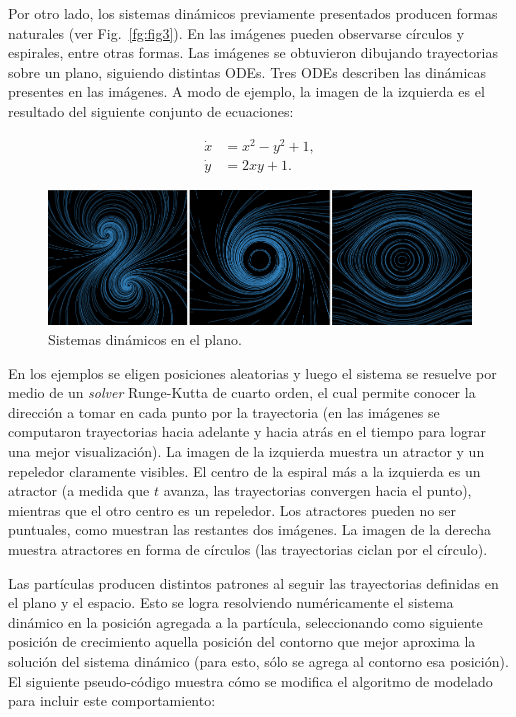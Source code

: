 \documentclass[spanish,a4paper,openright,11pt]{book}
\begin{document}
Por otro lado, los sistemas din\'amicos previamente presentados producen formas naturales (ver Fig.~\ref{fg:fig3}). En las im\'agenes pueden observarse c\'irculos y espirales, entre otras formas. Las im\'agenes se obtuvieron dibujando trayectorias sobre un plano, siguiendo distintas ODEs. Tres ODEs describen las din\'amicas presentes en las im\'agenes. A modo de ejemplo, la imagen de la izquierda es el resultado del siguiente conjunto de ecuaciones:

\begin{equation} \label{eq:simple}  
  \begin{aligned}
    \dot{x} &= x^{2}-y^{2}+1,\\
    \dot{y} &= 2xy+1.
  \end{aligned}
\end{equation}


\begin{figure}[htb!]
  \centerline{\includegraphics[scale=0.28]{sistdin2}}
  \caption{Sistemas din\'amicos en el plano.}
  \label{fg:sistdin2}
\end{figure}

En los ejemplos se eligen posiciones aleatorias y luego el sistema se resuelve por medio de un {\em solver} Runge-Kutta de cuarto orden, el cual permite conocer la direcci\'on a tomar en cada punto por la trayectoria (en las im\'agenes se computaron trayectorias hacia adelante y hacia atrás en el tiempo para lograr una mejor visualizaci\'on). La imagen de la izquierda muestra un atractor y un repeledor claramente visibles. El centro de la espiral m\'as a la izquierda es un atractor (a medida que $t$ avanza, las trayectorias convergen hacia el punto), mientras que el otro centro es un repeledor. Los atractores pueden no ser puntuales, como muestran las restantes dos im\'agenes. La imagen de la derecha muestra atractores en forma de c\'irculos (las trayectorias ciclan por el c\'irculo).

Las part\'iculas producen distintos patrones al seguir las trayectorias definidas en el plano y el espacio. Esto se logra resolviendo num\'ericamente el sistema din\'amico en la posici\'on agregada a la part\'icula, seleccionando como siguiente posici\'on de crecimiento aquella posici\'on del contorno que mejor aproxima la soluci\'on del sistema din\'amico (para esto, sólo se agrega al contorno esa posición). El siguiente pseudo-código muestra cómo se modifica el algoritmo de modelado para incluir este comportamiento:
\end{document}
